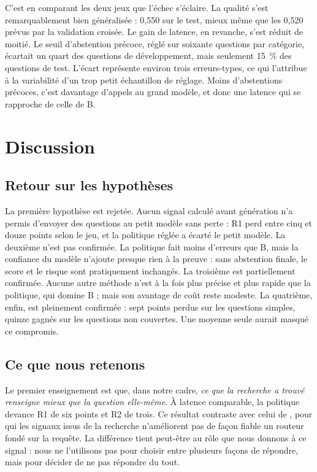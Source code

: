 \documentclass[11pt,a4paper]{article}
\begin{document}
C'est en comparant les deux jeux que l'échec s'éclaire. La qualité s'est remarquablement bien
généralisée : 0,550 sur le test, mieux même que les 0,520 prévus par la validation croisée. Le gain de
latence, en revanche, s'est réduit de moitié. Le seuil d'abstention précoce, réglé sur soixante
questions par catégorie, écartait un quart des questions de développement, mais seulement 15~\% des
questions de test. L'écart représente environ trois erreurs-types, ce qui l'attribue à la variabilité
d'un trop petit échantillon de réglage. Moins d'abstentions précoces, c'est davantage d'appels au grand
modèle, et donc une latence qui se rapproche de celle de B.

\section{Discussion}\label{sec:discussion}

\subsection{Retour sur les hypothèses}

La première hypothèse est rejetée. Aucun signal calculé avant génération n'a permis d'envoyer des
questions au petit modèle sans perte : R1 perd entre cinq et douze points selon le jeu, et la politique
réglée a écarté le petit modèle. La deuxième n'est pas confirmée. La politique fait moins d'erreurs que
B, mais la confiance du modèle n'ajoute presque rien à la preuve : sans abstention finale, le score et
le risque sont pratiquement inchangés. La troisième est partiellement confirmée. Aucune autre méthode
n'est à la fois plus précise et plus rapide que la politique, qui domine B ; mais son avantage de coût
reste modeste. La quatrième, enfin, est pleinement confirmée : sept points perdus sur les questions
simples, quinze gagnés sur les questions non couvertes. Une moyenne seule aurait masqué ce compromis.

\subsection{Ce que nous retenons}

Le premier enseignement est que, dans notre cadre, \emph{ce que la recherche a trouvé renseigne mieux
que la question elle-même}. À latence comparable, la politique devance R1 de six points et R2 de trois.
Ce résultat contraste avec celui de \citet{li2026beyond}, pour qui les signaux issus de la recherche
n'améliorent pas de façon fiable un routeur fondé sur la requête. La différence tient peut-être au rôle
que nous donnons à ce signal : nous ne l'utilisons pas pour choisir entre plusieurs façons de répondre,
mais pour décider de ne pas répondre du tout.
\end{document}
